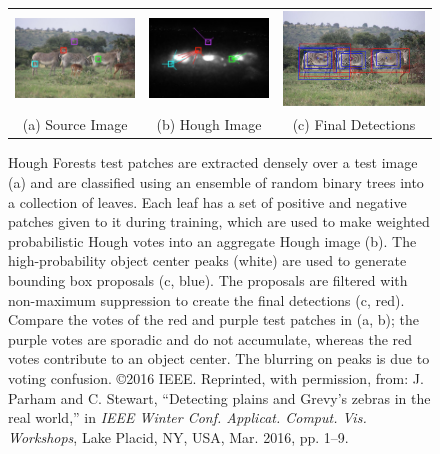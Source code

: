 \begin{figure}[!t]
    \begin{center}
        \begin{tabular}{ccc}
            \includegraphics[width=0.3\linewidth]{resources/rf1.pdf} &
            \includegraphics[width=0.3\linewidth]{resources/rf2.pdf} &
            \includegraphics[width=0.3\linewidth]{resources/rf3.pdf}   \\
            (a) Source Image                                         &
            (b) Hough Image                                          &
            (c) Final Detections
        \end{tabular}
    \end{center}
    \caption{Hough Forests test patches are extracted densely over a test image (a) and are classified using an ensemble of random binary trees into a collection of leaves.  Each leaf has a set of positive and negative patches given to it during training, which are used to make weighted probabilistic Hough votes into an aggregate Hough image (b).  The high-probability object center peaks (white) are used to generate bounding box proposals (c, blue).  The proposals are filtered with non-maximum suppression to create the final detections (c, red).  Compare the votes of the red and purple test patches in (a, b); the purple votes are sporadic and do not accumulate, whereas the red votes contribute to an object center.  The blurring on peaks is due to voting confusion.  \copyright 2016 IEEE. Reprinted, with permission, from: J. Parham and C. Stewart, ``Detecting plains and Grevy’s zebras in the real world,'' in \textit{IEEE Winter Conf. Applicat. Comput. Vis. Workshops}, Lake Placid, NY, USA, Mar. 2016, pp. 1–9.}
    \label{fig:randomforest}
\end{figure}

